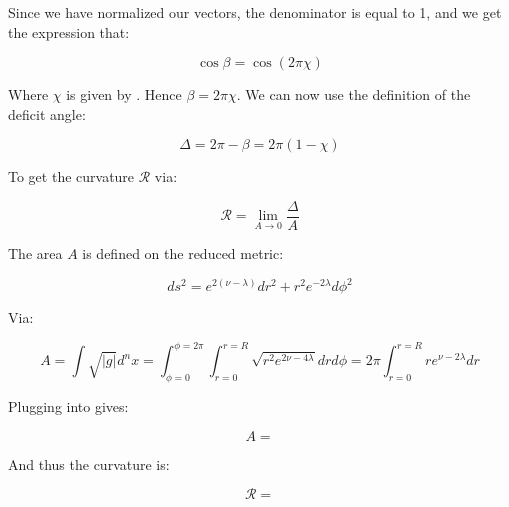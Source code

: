 \documentclass{article}
\begin{document}
Since we have normalized our vectors, the denominator is equal to 1, and we get the expression that:

\begin{equation}
\cos\beta=\cos(2\pi\chi)
\end{equation}

Where $\chi$ is given by . Hence $\beta=2\pi\chi$. We can now use the definition of the deficit angle:

\begin{equation}
\label{eq:deficit-angle}
\Delta=2\pi-\beta=2\pi(1-\chi)
\end{equation}

To get the curvature $\mathcal{R}$ via:

\begin{equation}
\label{eq:curvature}
\mathcal{R}=\lim_{A\rightarrow 0}\frac{\Delta}{A}
\end{equation}

The area $A$ is defined on the reduced metric:

\begin{equation}
ds^2=e^{2(\nu-\lambda)}dr^2+r^2 e^{-2\lambda}d\phi^2
\end{equation}

Via:

\begin{equation}
\label{eq:area}
A=\int\sqrt{|g|}d^n x=\int_{\phi=0}^{\phi=2\pi}\int_{r=0}^{r=R}\sqrt{r^2 e^{2\nu-4\lambda}}drd\phi=2\pi\int_{r=0}^{r=R}re^{\nu-2\lambda}dr
\end{equation}

Plugging  into  gives:

\begin{equation}
\label{eq:area-solved}
A=
\end{equation}

And thus the curvature is:

\begin{equation}
\label{eq:curvature-solved}
\mathcal{R}=
\end{equation}



\end{document}
